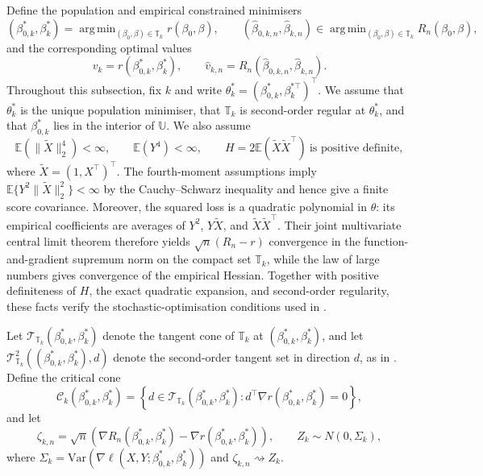 \documentclass[12pt]{article}
\DeclareMathOperator*{\argmin}{arg\,min}
\newenvironment{bluechange}{\begingroup\color[rgb]{0.00,0.00,1.00}}{\endgroup}
\theoremstyle{remark}
\theoremstyle{plain}
\begin{document}
Define the population and empirical constrained minimisers
\[
(\beta_{0,k}^{*},\beta_{k}^{*})=\argmin_{(\beta_{0},\beta)\in\mathbb{T}_{k}}r(\beta_{0},\beta),\qquad(\hat{\beta}_{0,k,n},\hat{\beta}_{k,n})\in\argmin_{(\beta_{0},\beta)\in\mathbb{T}_{k}}R_{n}(\beta_{0},\beta),
\]
and the corresponding optimal values
\[
v_{k}=r(\beta_{0,k}^{*},\beta_{k}^{*}),\qquad\hat{v}_{k,n}=R_{n}(\hat{\beta}_{0,k,n},\hat{\beta}_{k,n}).
\]
\begin{bluechange}
Throughout this subsection, fix $k$ and write $\theta_k^*=(\beta_{0,k}^*,\beta_k^{*\top})^\top$. We assume that $\theta_k^*$ is the unique population minimiser, that $\mathbb T_k$ is second-order regular at $\theta_k^*$, and that $\beta_{0,k}^*$ lies in the interior of $\mathbb U$. We also assume
\[
\mathbb E\left(\|\widetilde X\|_2^4\right)<\infty,
\qquad
\mathbb E(Y^4)<\infty,
\qquad
H=2\mathbb E(\widetilde X\widetilde X^\top)\ \text{is positive definite},
\]
where $\widetilde X=(1,X^\top)^\top$. The fourth-moment assumptions imply $\mathbb E\{Y^2\|\widetilde X\|_2^2\}<\infty$ by the Cauchy--Schwarz inequality and hence give a finite score covariance. Moreover, the squared loss is a quadratic polynomial in $\theta$: its empirical coefficients are averages of $Y^2$, $Y\widetilde X$, and $\widetilde X\widetilde X^\top$. Their joint multivariate central limit theorem therefore yields $\sqrt n(R_n-r)$ convergence in the function-and-gradient supremum norm on the compact set $\mathbb T_k$, while the law of large numbers gives convergence of the empirical Hessian. Together with positive definiteness of $H$, the exact quadratic expansion, and second-order regularity, these facts verify the stochastic-optimisation conditions used in \citet[Theorem 4.4]{shapiro_statistical_2000}.
\end{bluechange}

Let $\mathcal{T}_{\mathbb{T}_{k}}(\beta_{0,k}^{*},\beta_{k}^{*})$ denote the
tangent cone of $\mathbb{T}_{k}$ at $(\beta_{0,k}^{*},\beta_{k}^{*})$,
and let $\mathcal{T}_{\mathbb{T}_{k}}^{2}\left((\beta_{0,k}^{*},\beta_{k}^{*}),d\right)$
denote the second-order tangent set in direction $d$, as in \citet[Section 4]{shapiro_statistical_2000}.
Define the critical cone
\begin{equation}
\mathcal{C}_{k}(\beta_{0,k}^{*},\beta_{k}^{*})=\left\{ d\in \mathcal{T}_{\mathbb{T}_{k}}(\beta_{0,k}^{*},\beta_{k}^{*}):d^{\top}\nabla r(\beta_{0,k}^{*},\beta_{k}^{*})=0\right\} ,\label{Eqs: critical cone}
\end{equation}
and let
\[
\zeta_{k,n}=\sqrt{n}\left(\nabla R_{n}(\beta_{0,k}^{*},\beta_{k}^{*})-\nabla r(\beta_{0,k}^{*},\beta_{k}^{*})\right),\qquad Z_{k}\sim N(0,\Sigma_{k}),
\]
where $\Sigma_{k}=\mathrm{Var}\left(\nabla\ell(X,Y;\beta_{0,k}^{*},\beta_{k}^{*})\right)$
and $\zeta_{k,n}\rightsquigarrow Z_{k}$.
\end{document}
